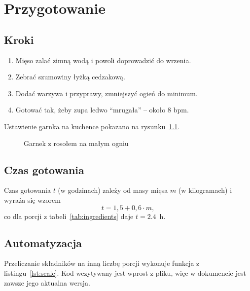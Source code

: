 \chapter{Przygotowanie}
\label{chap:cooking}

\section{Kroki}
\label{sec:steps}

\begin{enumerate}
  \item Mięso zalać zimną wodą i powoli doprowadzić do wrzenia.
  \item Zebrać szumowiny łyżką cedzakową.
  \item Dodać warzywa i przyprawy, zmniejszyć ogień do minimum.
  \item Gotować tak, żeby zupa ledwo \enquote{mrugała} -- około \num{8} \ac{bpm}.
\end{enumerate}

Ustawienie garnka na kuchence pokazano na rysunku~\ref{fig:pot}.

\begin{figure}[htbp]
  \centering
  \caption{Garnek z rosołem na małym ogniu}
  \label{fig:pot}
\end{figure}

\section{Czas gotowania}
\label{sec:time}

Czas gotowania $t$ (w godzinach) zależy od masy mięsa $m$ (w kilogramach) i wyraża się wzorem
\begin{equation}
  t = 1{,}5 + 0{,}6 \cdot m ,
  \label{eq:time}
\end{equation}
co dla porcji z tabeli~\ref{tab:ingredients} daje $t = \num{2.4}$~h.

\section{Automatyzacja}
\label{sec:automation}

Przeliczanie składników na inną liczbę porcji wykonuje funkcja  z listingu~\ref{lst:scale}.
Kod wczytywany jest wprost z pliku, więc w dokumencie jest zawsze jego aktualna wersja.


